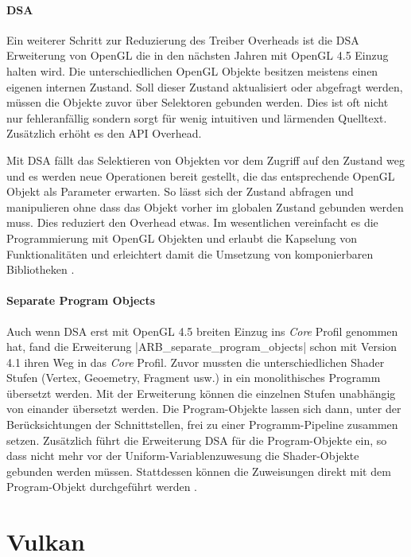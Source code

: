 \paragraph{\acl{DSA}} Ein weiterer Schritt zur Reduzierung des Treiber Overheads ist die \ac{DSA} Erweiterung von OpenGL \parencite{Killgard2014} die in den nächsten Jahren mit OpenGL 4.5 Einzug halten wird. Die unterschiedlichen OpenGL Objekte besitzen meistens einen eigenen internen Zustand. Soll dieser Zustand aktualisiert oder abgefragt werden, müssen die Objekte zuvor über Selektoren gebunden werden. Dies ist oft nicht nur fehleranfällig sondern sorgt für wenig intuitiven und lärmenden Quelltext. Zusätzlich erhöht es den API Overhead. 

Mit \ac{DSA} fällt das Selektieren von Objekten vor dem Zugriff auf den Zustand weg und es werden neue Operationen bereit gestellt, die das entsprechende OpenGL Objekt als Parameter erwarten. So lässt sich der Zustand abfragen und manipulieren ohne dass das Objekt vorher im globalen Zustand gebunden werden muss. Dies reduziert den Overhead etwas. Im wesentlichen vereinfacht es die Programmierung mit OpenGL Objekten und erlaubt die Kapselung von Funktionalitäten und erleichtert damit die Umsetzung von komponierbaren Bibliotheken .

\paragraph{Separate Program Objects} Auch wenn \ac{DSA} erst mit OpenGL 4.5 breiten Einzug ins \textit{Core} Profil genommen hat, fand die Erweiterung |ARB_separate_program_objects| \parencite{Killgard2011} schon mit Version 4.1 ihren Weg in das \textit{Core} Profil. Zuvor mussten die unterschiedlichen Shader Stufen (Vertex, Geoemetry, Fragment usw.) in ein monolithisches Programm übersetzt werden. Mit der Erweiterung können die einzelnen Stufen unabhängig von einander übersetzt werden. Die Program-Objekte lassen sich dann, unter der Berücksichtungen der Schnittstellen, frei zu einer Programm-Pipeline zusammen setzen. Zusätzlich führt die Erweiterung \ac{DSA} für die Program-Objekte ein, so dass nicht mehr vor der Uniform-Variablenzuwesung die Shader-Objekte gebunden werden müssen. Stattdessen können die Zuweisungen direkt mit dem Program-Objekt durchgeführt werden .


\section{Vulkan}\label{sec:vulkan}

